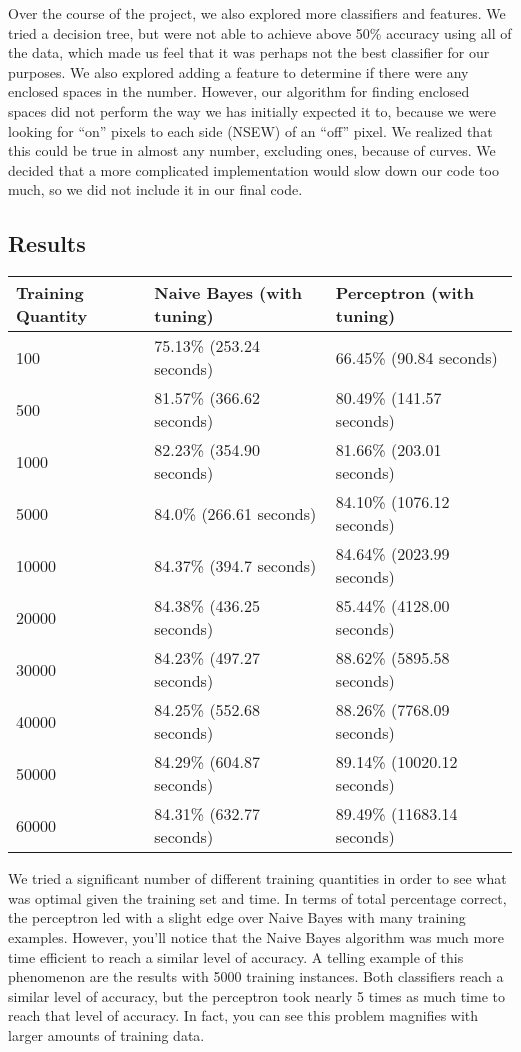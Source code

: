 \documentclass{article}
\theoremstyle{remark}
\begin{document}
    	Over the course of the project, we also explored more classifiers and features. We tried a decision tree, but were not able to achieve above 50\% accuracy using all of the data, which made us feel that it was perhaps not the best classifier for our purposes. We also explored adding a feature to determine if there were any enclosed spaces in the number. However, our algorithm for finding enclosed spaces did not perform the way we has initially expected it to, because we were looking for ``on'' pixels to each side (NSEW) of an ``off'' pixel. We realized that this could be true in almost any number, excluding ones, because of curves. We decided that a more complicated implementation would slow down our code too much, so we did not include it in our final code.
     \subsection*{Results}
     \begin{table}[h!]
        \centering
        \begin{tabular}{l|l|l}
        Training Quantity & Naive Bayes (with tuning) & Perceptron (with tuning)   \\ \hline
        100               & 75.13\% (253.24 seconds)  & 66.45\% (90.84 seconds)    \\
        500               & 81.57\% (366.62 seconds)  & 80.49\% (141.57 seconds)   \\
        1000              & 82.23\% (354.90 seconds)  & 81.66\% (203.01 seconds)   \\
        5000              & 84.0\% (266.61 seconds)   & 84.10\% (1076.12 seconds)  \\
        10000             & 84.37\% (394.7 seconds)   & 84.64\% (2023.99 seconds)  \\
        20000             & 84.38\% (436.25 seconds)  & 85.44\% (4128.00 seconds)  \\
        30000             & 84.23\% (497.27 seconds)  & 88.62\% (5895.58 seconds)  \\
        40000             & 84.25\% (552.68 seconds)  & 88.26\% (7768.09 seconds)  \\
        50000             & 84.29\% (604.87 seconds)  & 89.14\% (10020.12 seconds) \\
        60000             & 84.31\% (632.77 seconds)  & 89.49\% (11683.14 seconds) \\
        \end{tabular}
     \end{table}
     We tried a significant number of different training quantities in order to see what was optimal given the training set and time. In terms of total percentage correct, the perceptron led with a slight edge over Naive Bayes with many training examples. However, you'll notice that the Naive Bayes algorithm was much more time efficient to reach a similar level of accuracy. A telling example of this phenomenon are the results with 5000 training instances. Both classifiers reach a similar level of accuracy, but the perceptron took nearly 5 times as much time to reach that level of accuracy. In fact, you can see this problem magnifies with larger amounts of training data.
\end{document}
